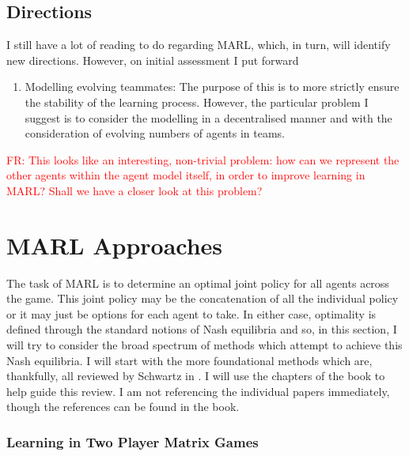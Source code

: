\documentclass[preprint,11pt]{report}
\newcommand\fr[1]{\textcolor{red}{FR: #1}}
\begin{document}
\subsection{Directions}

I still have a lot of reading to do regarding MARL, which, in turn, will identify new directions.
However, on initial assessment I put forward

\begin{enumerate} \item Modelling evolving teammates: The purpose of this is to more strictly ensure
the stability of the learning process. However, the particular problem I suggest is to consider the
modelling in a decentralised manner and with the consideration of evolving numbers of agents in
teams. \end{enumerate}

\fr{This looks like an interesting, non-trivial problem: how can we
  represent the other agents within the agent model itself, in order
  to improve learning in MARL? Shall we have a closer look at this problem?}


\section{MARL Approaches} \label{sec::MARL Approaches}

The task of MARL is to determine an optimal joint policy for all agents across the game. This joint
policy may be the concatenation of all the individual policy or it may just be options for each
agent to take. In either case, optimality is defined through the standard notions of Nash equilibria
and so, in this section, I will try to consider the broad spectrum of methods which attempt to
achieve this Nash equilibria. I will start with the more foundational methods which are, thankfully,
all reviewed by Schwartz in  \cite{SchwartzMulti-agentApproach}. I will use the chapters of the book
to help guide this review. I am not referencing the individual papers immediately, though the
references can be found in the book.

\subsubsection*{Learning in Two Player Matrix Games}
\end{document}

